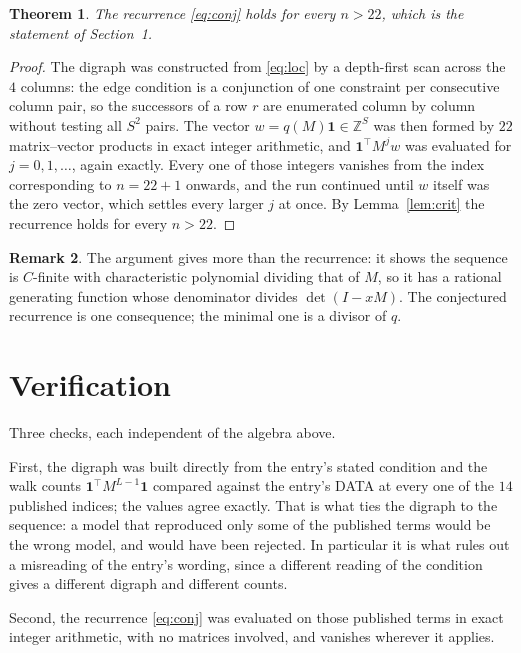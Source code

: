 \documentclass[11pt,a4paper]{article}
\theoremstyle{plain}
\newtheorem{theorem}{Theorem}
\theoremstyle{definition}
\newtheorem{remark}[theorem]{Remark}
\begin{document}
\begin{theorem}
The recurrence \eqref{eq:conj} holds for every $n>22$, which is the statement of
Section~1.
\end{theorem}

\begin{proof}
The digraph was constructed from \eqref{eq:loc} by a depth-first scan across the $4$
columns: the edge condition is a conjunction of one constraint per consecutive column
pair, so the successors of a row $r$ are enumerated column by column without testing all
$S^2$ pairs. The vector $w=q(M)\mathbf{1}\in\mathbb{Z}^{S}$ was then formed by $22$
matrix--vector products in exact integer arithmetic, and $\mathbf{1}^{\!\top}M^{j}w$ was
evaluated for $j=0,1,\dots$, again exactly. Every one of those integers vanishes from the
index corresponding to $n=22+1$ onwards, and the run continued until $w$ itself was the
zero vector, which settles every larger $j$ at once. By Lemma~\ref{lem:crit} the recurrence
holds for every $n>22$.
\end{proof}

\begin{remark}
The argument gives more than the recurrence: it shows the sequence is $C$-finite with
characteristic polynomial dividing that of $M$, so it has a rational generating function
whose denominator divides $\det(I-xM)$. The conjectured recurrence is one consequence; the
minimal one is a divisor of $q$.
\end{remark}

\section{Verification}

Three checks, each independent of the algebra above.

First, the digraph was built directly from the entry's stated condition and the walk counts
$\mathbf{1}^{\!\top}M^{L-1}\mathbf{1}$ compared against the entry's DATA at
every one of the $14$ published indices; the values agree exactly. That is what ties
the digraph to the sequence: a model that reproduced only some of the published terms would
be the wrong model, and would have been rejected. In particular it is what rules out a
misreading of the entry's wording, since a different reading of the condition gives a
different digraph and different counts.

Second, the recurrence \eqref{eq:conj} was evaluated on those published terms in exact
integer arithmetic, with no matrices involved, and vanishes wherever it applies.
\end{document}
